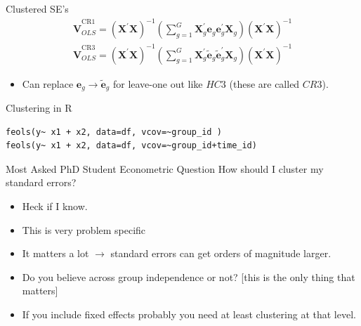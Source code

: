 \begin{frame}{Clustered SE's}
\begin{align*}
\widehat { \boldsymbol { V } } _ { OLS } ^ { \mathrm { CR } 1 } = \left( \boldsymbol { X } ^ { \prime } \boldsymbol { X } \right) ^ { - 1 } \left( \sum _ { g = 1 } ^ { G } \boldsymbol { X } _ { g } ^ { \prime } \boldsymbol { e }_ { g }  \boldsymbol { e }_ { g } ^ { \prime } \boldsymbol { X } _ { g } \right) \left( \boldsymbol { X } ^ { \prime } \boldsymbol { X } \right) ^ { - 1 }\\
\widehat { \boldsymbol { V } } _ { OLS } ^ { \mathrm { CR } 3 } = \left( \boldsymbol { X } ^ { \prime } \boldsymbol { X } \right) ^ { - 1 } \left( \sum _ { g = 1 } ^ { G } \boldsymbol { X } _ { g } ^ { \prime } \widetilde { \boldsymbol { e } } _ { g }  \widetilde { \boldsymbol { e } } _ { g } ^ { \prime } \boldsymbol { X } _ { g } \right) \left( \boldsymbol { X } ^ { \prime } \boldsymbol { X } \right) ^ { - 1 }
\end{align*}
\begin{itemize}
\item Can replace  $\mathbf{e}_g  \rightarrow \tilde { \mathbf{e}}_g $ for leave-one out like $HC3$ (these are called $CR3$).
\end{itemize}
\end{frame}


\begin{frame}[fragile]{Clustering in R}
\begin{lstlisting}
feols(y~ x1 + x2, data=df, vcov=~group_id )
feols(y~ x1 + x2, data=df, vcov=~group_id+time_id)
\end{lstlisting}
\end{frame}



\begin{frame}{Most Asked PhD Student Econometric Question}
 How should I cluster my standard errors?
\begin{itemize}
\item Heck if I know.
\item This is very problem specific
\item It matters a lot $\rightarrow$ standard errors can get orders of magnitude larger.
\item Do you believe across group independence or not? [this is the only thing that matters]
\item If you include \alert{fixed effects} probably you need at least clustering at that level.
\end{itemize}
\end{frame}



